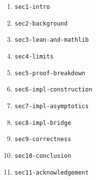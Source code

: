 \documentclass{article}
\begin{document}
\begin{enumerate}
\item \texttt{sec1-intro}
\item \ok \texttt{sec2-background}
\item \ok \texttt{sec3-lean-and-mathlib}
\item \ok \texttt{sec4-limits}
\item \texttt{sec5-proof-breakdown}
\item \texttt{sec6-impl-construction}
\item \texttt{sec7-impl-asymptotics}
\item \texttt{sec8-impl-bridge}
\item \texttt{sec9-correctness}
\item \texttt{sec10-conclusion}
\item \ok \texttt{sec11-acknowledgement}
\end{enumerate}
\end{document}

